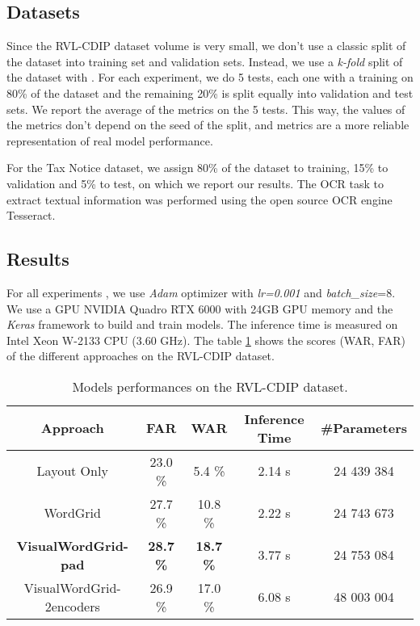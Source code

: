 \documentclass[conference]{IEEEtran}
\begin{document}
\subsection{Datasets}
Since the RVL-CDIP dataset volume is very small, we don't use a classic split of the dataset into training set and validation sets. Instead,  we use a \textit{k-fold} split of the dataset with . For each experiment, we do 5 tests, each one with a training on 80\% of the dataset and the remaining 20\% is split equally into validation and test sets. We report the average of the metrics on the 5 tests. This way, the values of the metrics don't depend on the seed of the split, and metrics are a more reliable representation of real model performance.  

For the Tax Notice dataset, we assign 80\% of the dataset to training, 15\% to validation and 5\% to test, on which we report our results.  The OCR task to extract textual information was performed using the open source OCR engine Tesseract.  
 \subsection{Results}
For all experiments , we use \textit{Adam} optimizer with \textit{lr=0.001} and \textit{batch\_size}=8. We use a GPU NVIDIA Quadro RTX 6000 with 24GB GPU memory and the  \textit{Keras} framework \cite{keras} to build and train models. The inference time is measured on  Intel Xeon W-2133 CPU (3.60 GHz).  The table \ref{tab1} shows the scores (WAR, FAR) of the different approaches on the RVL-CDIP dataset.\\

\begin{table}[!htbp] 
\begin{adjustbox}{width=.485\textwidth,center}
\label{tab:schemes} 
\centering 
\begin{tabular}{|c|c|c|c|c|}

\hline
 Approach & FAR    & WAR & Inference Time& \#Parameters   \\
\hline

Layout Only  & 23.0 \%   &   5.4 \% & 2.14 s & 24 439 384\\
\hline
WordGrid  & 27.7 \%   &  10.8 \% & 2.22 s  &  24 743 673 \\
\hline
\textbf{VisualWordGrid-pad}  & \textbf{28.7 \%}   &  \textbf{18.7 \%} &
3.77 s & 
24 753 084\\
\hline
VisualWordGrid-2encoders  & 26.9 \%   &  17.0 \% & 
6.08 s & 48 003 004\\

\hline
\end{tabular}
\end{adjustbox}
\caption{Models performances on the RVL-CDIP dataset.}
\label{tab1}
\end{table}
\end{document}
